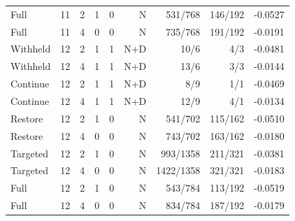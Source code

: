 \begin{table}[t]
\begin{tabular}{llrrrrrrr}
Full & 11 & 2 & 1 & 0 & N & 531/768 & 146/192 & -0.0527 \\
Full & 11 & 4 & 0 & 0 & N & 735/768 & 191/192 & -0.0191 \\
Withheld & 12 & 2 & 1 & 1 & N+D & 10/6 & 4/3 & -0.0481 \\
Withheld & 12 & 4 & 1 & 1 & N+D & 13/6 & 3/3 & -0.0144 \\
Continue & 12 & 2 & 1 & 1 & N+D & 8/9 & 1/1 & -0.0469 \\
Continue & 12 & 4 & 1 & 1 & N+D & 12/9 & 4/1 & -0.0134 \\
Restore & 12 & 2 & 1 & 0 & N & 541/702 & 115/162 & -0.0510 \\
Restore & 12 & 4 & 0 & 0 & N & 743/702 & 163/162 & -0.0180 \\
Targeted & 12 & 2 & 1 & 0 & N & 993/1358 & 211/321 & -0.0381 \\
Targeted & 12 & 4 & 0 & 0 & N & 1422/1358 & 321/321 & -0.0183 \\
Full & 12 & 2 & 1 & 0 & N & 543/784 & 113/192 & -0.0519 \\
Full & 12 & 4 & 0 & 0 & N & 834/784 & 187/192 & -0.0179 \\
\bottomrule\end{tabular}\end{table}

